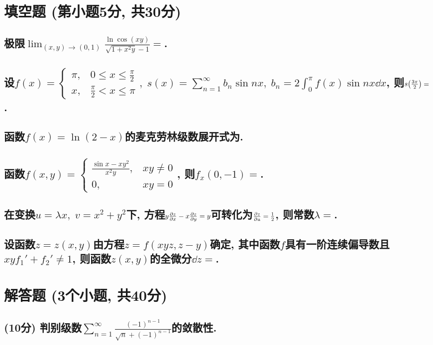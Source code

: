 \documentclass[12pt]{ctexart}
\begin{document}
\section{填空题 (第小题5分, 共30分)}
\subsection{极限$\lim_{(x,y)\rightarrow(0,1)}\frac{\ln{\cos(xy)}}{\sqrt{1+x^{2}y}-1}=$\blank.}
\subsection{设$f(x)=\begin{cases}
	\pi,{}&0\le x\le\frac{\pi}{2}\\
	x,{}&\frac{\pi}{2}<x\le\pi
\end{cases},\;s(x)=\sum_{n=1}^{\infty}b_n\sin{nx},\;b_n=2\int_{0}^{\pi}f(x)\sin{nx}\dd{x}$, 则$s\qty(\frac{3\pi}{2})=$\blank.}
\subsection{函数$f(x)=\ln(2-x)$的麦克劳林级数展开式为\blank.}
\subsection{函数$f(x,y)=\begin{cases}
	\frac{\sin{x}-xy^2}{x^2y},{}&xy\ne0\\
	0,{}&xy=0
\end{cases}$, 则$f_x(0,-1)=$\blank.}
\subsection{在变换$u=\lambda x,\;v=x^{2}+y^{2}$下, 方程$y\pdv{z}{x}-x\pdv{z}{y}=y$可转化为$\pdv{z}{u}=\frac{1}{2}$, 则常数$\lambda=$\blank.}
\subsection{设函数$z=z(x,y)$由方程$z=f(xyz,z-y)$确定, 其中函数$f$具有一阶连续偏导数且$xyf_1'+f_2'\ne1$, 则函数$z(x,y)$的全微分$\dd{z}=$\blank.}
\section{解答题 (3个小题, 共40分)}
\subsection{(10分) 判别级数$\sum_{n=1}^{\infty}\frac{(-1)^{n-1}}{\sqrt{n}+(-1)^{n-1}}$的敛散性.}
\end{document}
